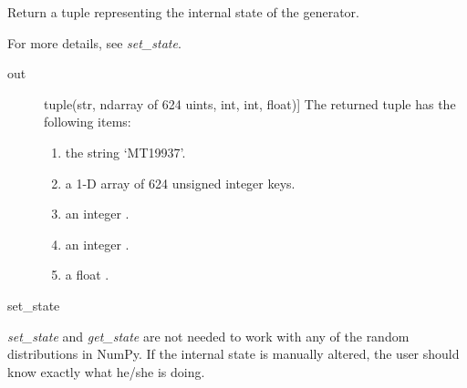 \documentclass[letterpaper,10pt,english]{sphinxmanual}
\begin{document}

\begin{fulllineitems}
\label{pygeomod:pygeomod.geomodeller_xml_obj.get_state}
Return a tuple representing the internal state of the generator.

For more details, see \emph{set\_state}.
\begin{description}
\item[{out}] \leavevmode{[}tuple(str, ndarray of 624 uints, int, int, float){]}
The returned tuple has the following items:
\begin{enumerate}
\item {} 
the string `MT19937'.

\item {} 
a 1-D array of 624 unsigned integer keys.

\item {} 
an integer .

\item {} 
an integer .

\item {} 
a float .

\end{enumerate}

\end{description}

set\_state

\emph{set\_state} and \emph{get\_state} are not needed to work with any of the
random distributions in NumPy. If the internal state is manually altered,
the user should know exactly what he/she is doing.

\end{fulllineitems}

\end{document}
